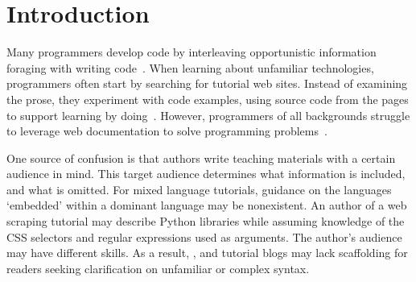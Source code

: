 \section{Introduction}

Many programmers develop code by interleaving opportunistic information foraging with writing code~\cite{brandt_two_2009,brandt_example-centric_2010}.
When learning about unfamiliar technologies, programmers often start by searching for tutorial web sites.
Instead of examining the prose, they experiment with code examples, using source code from the pages to support learning by doing~\cite{brandt_two_2009}.
However, programmers of all backgrounds struggle to leverage web documentation to solve programming problems~\cite{duala-ekoko_asking_2012,dorn_lost_2013,dorn_learning_2010}.

One source of confusion is that authors write teaching materials with a certain audience in mind.
This target audience determines what information is included, and what is omitted.
For mixed language tutorials, guidance on the languages `embedded' within a dominant language may be nonexistent.
An author of a web scraping tutorial may describe Python libraries while assuming knowledge of the CSS selectors and regular expressions used as arguments.
The author's audience may have different skills.
As a result, , and tutorial blogs may lack scaffolding for readers seeking clarification on unfamiliar or complex syntax.

